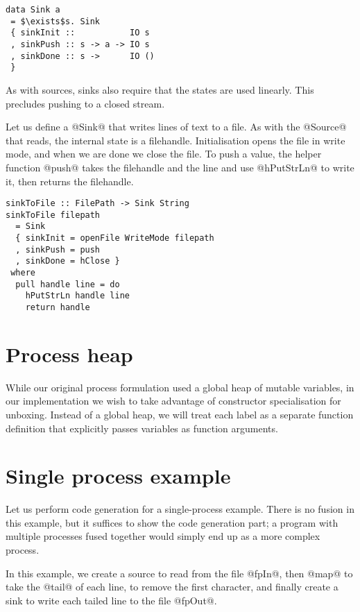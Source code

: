 \begin{lstlisting}[mathescape=true]
data Sink a
 = $\exists$s. Sink
 { sinkInit ::           IO s
 , sinkPush :: s -> a -> IO s
 , sinkDone :: s ->      IO ()
 }
\end{lstlisting}

As with sources, sinks also require that the states are used linearly.
This precludes pushing to a closed stream.

Let us define a @Sink@ that writes lines of text to a file.
As with the @Source@ that reads, the internal state is a filehandle.
Initialisation opens the file in write mode, and when we are done we close the file.
To push a value, the helper function @push@ takes the filehandle and the line and use @hPutStrLn@ to write it, then returns the filehandle.

\begin{lstlisting}
sinkToFile :: FilePath -> Sink String
sinkToFile filepath
  = Sink
  { sinkInit = openFile WriteMode filepath
  , sinkPush = push
  , sinkDone = hClose }
 where
  pull handle line = do
    hPutStrLn handle line
    return handle
\end{lstlisting}


\section{Process heap}
While our original process formulation  used a global heap of mutable variables, in our implementation we wish to take advantage of constructor specialisation for unboxing.
Instead of a global heap, we will treat each label as a separate function definition that explicitly passes variables as function arguments.


\section{Single process example}
Let us perform code generation for a single-process example.
There is no fusion in this example, but it suffices to show the code generation part; a program with multiple processes fused together would simply end up as a more complex process.

In this example, we create a source to read from the file @fpIn@, then @map@ to take the @tail@ of each line, to remove the first character, and finally create a sink to write each tailed line to the file @fpOut@.

